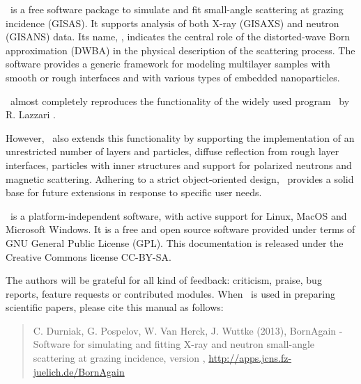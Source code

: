 \newpage
{}


\BornAgain\ is a free software package to simulate and fit small-angle
scattering at grazing incidence (GISAS). 
It supports analysis of both  X-ray (GISAXS) and neutron (GISANS) data.
Its name, \BornAgain, indicates the central role of the distorted-wave Born
approximation (DWBA) in the physical description of the
scattering process. The software provides a generic framework for modeling multilayer samples with smooth or
rough interfaces and with various types of embedded nano\-particles.

\BornAgain\ almost completely reproduces the functionality
of the widely used program \IsGISAXS\
by R. Lazzari \cite{Laz02}.

However, \BornAgain\ also extends this functionality by
supporting the implementation of an unrestricted number of layers and particles, 
diffuse reflection from rough layer interfaces,
particles with inner structures and 
support for polarized neutrons and magnetic scattering.
Adhering to a strict object-oriented design,
\BornAgain\ provides a solid base for future extensions
in response to specific user needs.

\BornAgain\ is a platform-independent software,
with active support for Linux, MacOS and 
Microsoft Windows. 
It is a free and open source software provided under terms
of GNU General Public License (GPL).
This documentation is released under the Creative Commons license CC-BY-SA.

The authors will be grateful for all kind of
feedback: criticism, praise, bug reports, feature requests
or contributed modules.
When \BornAgain\ is used in preparing scientific papers,
please cite this manual as follows: 
\begin{quote}
C. Durniak, G. Pospelov, W. Van Herck, J. Wuttke (2013),\newline
BornAgain - Software for simulating and fitting
X-ray and neutron small-angle scattering at grazing incidence,
version \UserManualVersionNumber,\newline
\url{http://apps.jcns.fz-juelich.de/BornAgain}
\end{quote}

